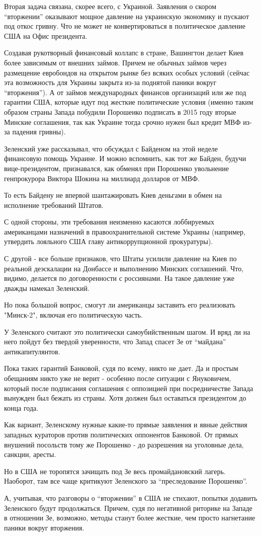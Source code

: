 Вторая задача связана, скорее всего, с Украиной. Заявления о скором \enquote{вторжении}
оказывают мощное давление на украинскую экономику и пускают под откос гривну.
Что не может не конвертироваться в политическое давление США на Офис
президента.

Создавая рукотворный финансовый коллапс в стране, Вашингтон делает Киев более
зависимым от внешних займов. Причем не обычных займов через размещение
евробондов на открытом рынке без всяких особых условий (сейчас эта возможность
для Украины закрыта из-за поднятой паники вокруг \enquote{вторжения}). А от займов
международных финансов организаций или же под гарантии США, которые идут под
жесткие политические условия (именно таким образом страны Запада побудили
Порошенко подписать в 2015 году вторые Минские соглашения, так как Украине
тогда срочно нужен был кредит МВФ из-за падения гривны).

Зеленский уже рассказывал, что обсуждал с Байденом на этой неделе финансовую
помощь Украине. И можно вспомнить, как тот же Байден, будучи вице-президентом,
признавался, как обменял при Порошенко увольнение генпрокурора Виктора Шокина
на миллиард долларов от МВФ. 

То есть Байдену не впервой шантажировать Киев деньгами в обмен на исполнение
требований Штатов. 

С одной стороны, эти требования неизменно касаются лоббируемых американцами
назначений в правоохранительной системе Украины (например, утвердить лояльного
США главу антикоррупционной прокуратуры).

С другой - все больше признаков, что Штаты усилили давление на Киев по реальной
деэскалации на Донбассе и выполнению Минских соглашений. Что, видимо, делается
по договоренности с россиянами. На такое давление уже дважды намекал Зеленский.

Но пока большой вопрос, смогут ли американцы заставить его реализовать
"Минск-2", включая его политическую часть. 

У Зеленского считают это политически самоубийственным шагом. И вряд ли на него
пойдут без твердой уверенности, что Запад спасет Зе от \enquote{майдана}
антикапитулянтов.

Пока таких гарантий Банковой, судя по всему, никто не дает. Да и простым
обещаниям никто уже не верит - особенно после ситуации с Януковичем, который
после подписания соглашения с оппозицией при посредничестве Запада вынужден был
бежать из страны. Хотя должен был оставаться президентом до конца года. 

Как вариант, Зеленскому нужные какие-то прямые заявления и явные действия
западных кураторов против политических оппонентов Банковой. От прямых внушений
посольств тому же Порошенко - до разрешения на уголовные дела, санкции, аресты. 

Но в США не торопятся зачищать под Зе весь промайдановский лагерь. Наоборот,
там все чаще критикуют Зеленского за \enquote{преследование Порошенко}.

А, учитывая, что разговоры о \enquote{вторжении} в США не стихают, попытки додавить
Зеленского будут продолжаться. Причем, судя по негативной риторике на Западе в
отношении Зе, возможно, методы станут более жесткие, чем просто нагнетание
паники вокруг вторжения.
